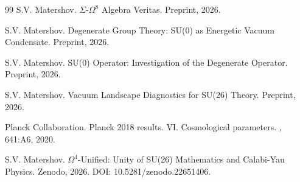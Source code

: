 \documentclass[12pt,a4paper,twoside]{article}
\theoremstyle{definition}
\begin{document}
\begin{thebibliography}{99}
S.V. Matershov.
\newblock $\Sigma$-$\Omega^8$ Algebra Veritas.
\newblock Preprint, 2026.

S.V. Matershov.
\newblock Degenerate Group Theory: SU(0) as Energetic Vacuum Condensate.
\newblock Preprint, 2026.

S.V. Matershov.
\newblock SU(0) Operator: Investigation of the Degenerate Operator.
\newblock Preprint, 2026.

S.V. Matershov.
\newblock Vacuum Landscape Diagnostics for SU(26) Theory.
\newblock Preprint, 2026.

Planck Collaboration.
\newblock Planck 2018 results. VI. Cosmological parameters.
, 641:A6, 2020.

S.V. Matershov.
\newblock $\Omega^4$-Unified: Unity of SU(26) Mathematics and Calabi-Yau Physics.
\newblock Zenodo, 2026. DOI: 10.5281/zenodo.22651406.

\end{thebibliography}
\end{document}
